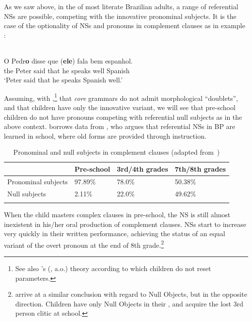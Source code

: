 \documentclass[output=paper]{langsci/langscibook}
\begin{document}
As we saw above, in the  of most literate Brazilian adults, a range
of referential NSs are possible, competing with the innovative pronominal
subjects. It is the case of the optionality of NSs and pronouns in complement
clauses as in example :

\ea%
    \label{ex:key:15/2}\\
	\gll	O Pedr\textbf{o} disse que (\textbf{ele}) fala bem     espanhol.\\
            the Peter said that \hphantom{(}he speaks well  Spanish\\
	\glt	\enquote*{Peter said that  he speaks Spanish well.}
\z

Assuming, with \citet{Kato2011},\footnote{See also \citeauthor{Dresher1999}'s
(\citeyear{Dresher1999}, a.o.) theory according to which children do not reset
parameters.} that \emph{core} grammars do not admit morphological “doublets”,
and that children have only the innovative variant, we will see that pre-school
children do not have pronouns competing with referential null subjects as in
the above context. \citeauthor{Kato2011} borrows data from
\textcite{Magalhaes2003}, who argues that referential NSs in
\gls{BP} are learned in school, where old forms are
provided through instruction.\largerpage[1]

\begin{table}[htpb]
    \centering
    \begin{tabularx}{\textwidth}{lXXX}
    \lsptoprule
                         & Pre-school & 3rd/4th grades & 7th/8th grades\\
    \midrule
    Pronominal subjects & 97.89\%    & 78.0\%         & 50.38\%\\
    Null subjects       & 2.11\%     & 22.0\%         & 49.62\%\\
    \lspbottomrule
    \end{tabularx}
    \caption{Pronominal and null subjects in complement clauses (adapted
    from~\citealt{Magalhaes2003})}\label{tab:key:26.2}
\end{table}

When the child masters complex clauses in pre-school, the NS is still almost
inexistent in his/her oral production of complement clauses. NSs start to
increase very quickly in their written performance, achieving the status of an
equal variant of the overt pronoun at the end of 8th
grade.\footnote{\citet{KatoEtAl2009} arrive at a similar conclusion
    with regard to Null Objects, but in the opposite direction. Children have
    only Null Objects in their , and acquire the lost 3rd person
clitic at school.}
\end{document}
